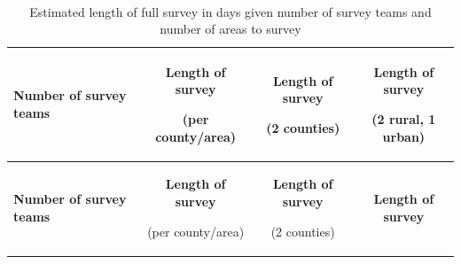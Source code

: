 \documentclass[12pt,a4paper]{book}
\theoremstyle{definition}
\theoremstyle{definition}
\theoremstyle{definition}
\theoremstyle{remark}
\begin{document}
~

\begin{longtable}[]{@{}lccc@{}}
\caption{\label{tab:surveydays} Estimated length of full survey in days
given number of survey teams and number of areas to
survey}\tabularnewline
\toprule
\begin{minipage}[b]{0.24\columnwidth}\raggedright
\textbf{Number of survey teams}\strut
\end{minipage} & \begin{minipage}[b]{0.24\columnwidth}\centering
\textbf{Length of survey}

(per county/area)\strut
\end{minipage} & \begin{minipage}[b]{0.24\columnwidth}\centering
\textbf{Length of survey}

(2 counties)\strut
\end{minipage} & \begin{minipage}[b]{0.24\columnwidth}\centering
\textbf{Length of survey}

(2 rural, 1 urban)\strut
\end{minipage}\tabularnewline
\midrule
\endfirsthead
\toprule
\begin{minipage}[b]{0.24\columnwidth}\raggedright
\textbf{Number of survey teams}\strut
\end{minipage} & \begin{minipage}[b]{0.24\columnwidth}\centering
\textbf{Length of survey}

(per county/area)\strut
\end{minipage} & \begin{minipage}[b]{0.24\columnwidth}\centering
\textbf{Length of survey}

(2 counties)\strut
\end{minipage} & \begin{minipage}[b]{0.24\columnwidth}\centering
\textbf{Length of survey}


\end{minipage}
\end{longtable}
\end{document}
